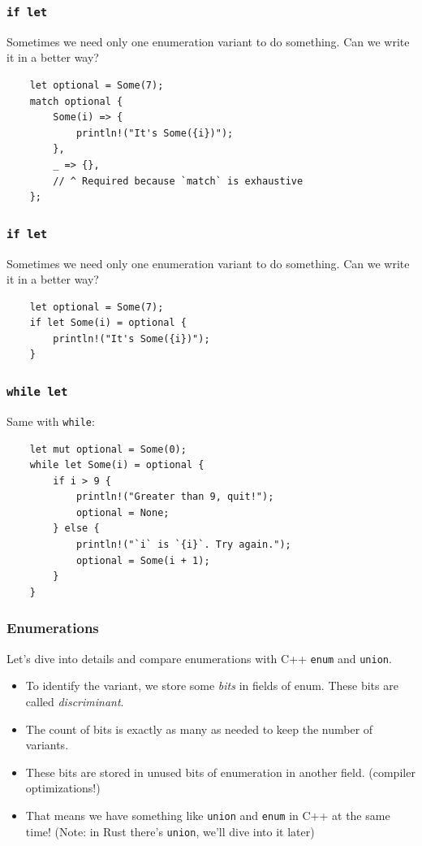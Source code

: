 \documentclass[aspectratio=1610,t]{beamer}
\begin{document}

\begin{frame}[fragile]
\frametitle{\texttt{if let}}
Sometimes we need only one enumeration variant to do something. Can we write it in a better way?

\begin{verbatim}
    let optional = Some(7);
    match optional {
        Some(i) => {
            println!("It's Some({i})");
        },
        _ => {},
        // ^ Required because `match` is exhaustive
    };
\end{verbatim}
\end{frame}


\begin{frame}[fragile]
\frametitle{\texttt{if let}}
Sometimes we need only one enumeration variant to do something. Can we write it in a better way?

\begin{verbatim}
    let optional = Some(7);
    if let Some(i) = optional {
        println!("It's Some({i})");
    }
\end{verbatim}
\end{frame}


\begin{frame}[fragile]
\frametitle{\texttt{while let}}
Same with \texttt{while}:

\begin{verbatim}
    let mut optional = Some(0);
    while let Some(i) = optional {
        if i > 9 {
            println!("Greater than 9, quit!");
            optional = None;
        } else {
            println!("`i` is `{i}`. Try again.");
            optional = Some(i + 1);
        }
    }
\end{verbatim}
\end{frame}


\begin{frame}[fragile]
\frametitle{Enumerations}
Let's dive into details and compare enumerations with C++ \texttt{enum} and \texttt{union}.

\begin{itemize}
    \item To identify the variant, we store some \textit{bits} in fields of enum. These bits are called \textit{discriminant}.
    \item The count of bits is exactly as many as needed to keep the number of variants.
    \item These bits are stored in unused bits of enumeration in another field. (compiler optimizations!)
    \item That means we have something like \texttt{union} and \texttt{enum} in C++ at the same time! (Note: in Rust there's \texttt{union}, we'll dive into it later)
\end{itemize}
\end{frame}
\end{document}
